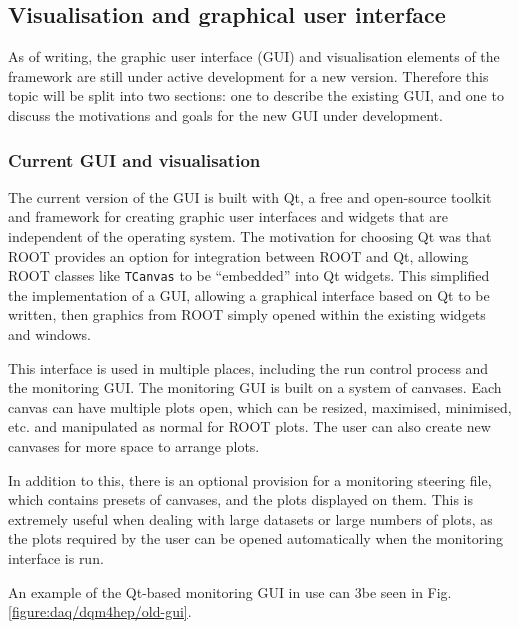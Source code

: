 \subsection{Visualisation and graphical user interface}
As of writing, the graphic user interface (\acrshort{GUI}) and visualisation elements of the framework are still under active development for a new version. Therefore this topic will be split into two sections: one to describe the existing \acrshort{GUI}, and one to discuss the motivations and goals for the new \acrshort{GUI} under development. 

\subsubsection{Current GUI and visualisation} 
The current version of the \acrshort{GUI} is built with Qt, a free and open-source toolkit and framework for creating graphic user interfaces and widgets that are independent of the operating system. The motivation for choosing Qt was that ROOT provides an option for integration between ROOT and Qt, allowing ROOT classes like \texttt{TCanvas} to be ``embedded'' into Qt widgets. This simplified the implementation of a \acrshort{GUI}, allowing a graphical interface based on Qt to be written, then graphics from ROOT simply opened within the existing widgets and windows. %

This interface is used in multiple places, including the run control process and the monitoring \acrshort{GUI}. The monitoring \acrshort{GUI} is built on a system of canvases. Each canvas can have multiple plots open, which can be resized, maximised, minimised, etc. and manipulated as normal for ROOT plots. The user can also create new canvases for more space to arrange plots.

In addition to this, there is an optional provision for a monitoring steering file, which contains presets of canvases, and the plots displayed on them. This is extremely useful when dealing with large datasets or large numbers of plots, as the plots required by the user can be opened automatically when the monitoring interface is run.

An example of the Qt-based monitoring \acrshort{GUI} in use can 3be seen in Fig. \ref{figure:daq/dqm4hep/old-gui}. 

